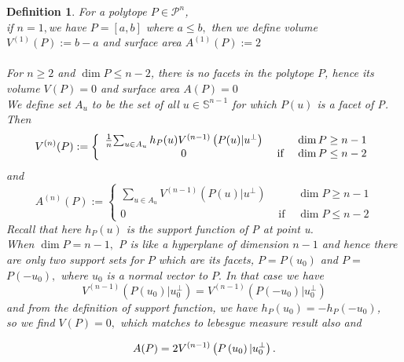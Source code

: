 \documentclass[oneside]{book}
\newtheorem{mydef}{Definition}
\begin{document}
  \begin{mydef}
For a polytope $P \in \mathcal{P}^{n}$,\\
if  $n=1,$we have  $P=[a, b]$ where $a \leq b,$ then we define volume $V^{(1)}(P):=b-a$ and  surface area $A^{(1)}(P):=2$ 
\\\\
  For  $ n \geq 2  $ and $\operatorname{dim} P \leq n-2$, there is no facets in the polytope $P$, hence its volume $V(P)=0$ and surface area $A(P)=0$ \\
  
 We define set $A_{{u}}$ to be the set of all $u \in \mathbb{S}^{n-1}$ for which $P(u)$ is a facet of P. Then 
\begin{equation}
\label{eq43}
V^{(n)}(P):=\left\{\begin{array}{ccc}
\frac{1}{n} $$ \sum_{u \in A_{u}} h_{P}(u) V^{(n-1)}\left(P(u) | u^{\perp}\right) & & \operatorname{dim} P \geq n-1 \\
0 & \text { if } & \operatorname{dim} P \leq n-2
\end{array}\right.
\end{equation}
and
\begin{equation}
\label{eq44}
A^{(n)}(P):=\left\{\begin{array}{ccc}
\sum_{u \in A_{u}} V^{(n-1)}\left(P(u) | u^{\perp}\right) & & \operatorname{dim} P \geq n-1 \\
0 & \text { if } & \operatorname{dim} P \leq n-2
\end{array}\right.
\end{equation}
Recall that here $h_{P}(u)$ is the support function of P at point u. \\
 When $\operatorname{dim} P=n-1, $ P is like a hyperplane of dimension $n - 1$  and hence there are only two support sets for $P$ which are its facets, $P=P\left(u_{0}\right)$ and $P=$ $P\left(-u_{0}\right),$ where $u_{0}$ is a normal vector to $P .$ In that case we have $$V^{(n-1)}\left(P\left(u_{0}\right) | u_{0}^{\perp}\right)=V^{(n-1)}\left(P\left(-u_{0}\right) | u_{0}^{\perp}\right)$$
 \newpage
and from the  definition of support function, we have $h_{P}\left(u_{0}\right)=-h_{P}\left(-u_{0}\right)$,\\ so we find $V(P)=0,$ which matches to lebesgue measure result also  and 
 
 \begin{equation}
 \label{eq45}
 A(P)=2 V^{(n-1)}\left(P\left(u_{0}\right) | u_{0}^{\perp}\right).\\\\
\end{equation}
\end{mydef} 
\end{document}
